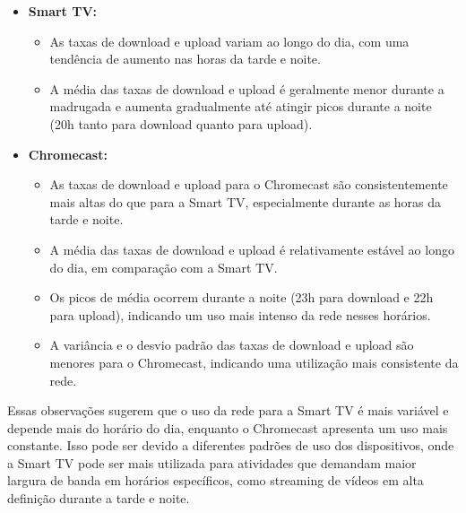 \begin{itemize}
    \item \textbf{Smart TV:}
    \begin{itemize}
        \item As taxas de download e upload variam ao longo do dia, com uma tendência de aumento nas horas da tarde e noite.
        \item A média das taxas de download e upload é geralmente menor durante a madrugada e aumenta gradualmente até atingir picos durante a noite (20h tanto para download quanto para upload).
    \end{itemize}
    \item \textbf{Chromecast:}
    \begin{itemize}
        \item As taxas de download e upload para o Chromecast são consistentemente mais altas do que para a Smart TV, especialmente durante as horas da tarde e noite.
        \item A média das taxas de download e upload é relativamente estável ao longo do dia, em comparação com a Smart TV.
        \item Os picos de média ocorrem durante a noite (23h para download e 22h para upload), indicando um uso mais intenso da rede nesses horários.
        \item A variância e o desvio padrão das taxas de download e upload são menores para o Chromecast, indicando uma utilização mais consistente da rede.
    \end{itemize}
\end{itemize}

Essas observações sugerem que o uso da rede para a Smart TV é mais variável e depende mais do horário do dia, enquanto o Chromecast apresenta um uso mais constante. Isso pode ser devido a diferentes padrões de uso dos dispositivos, onde a Smart TV pode ser mais utilizada para atividades que demandam maior largura de banda em horários específicos, como streaming de vídeos em alta definição durante a tarde e noite.


